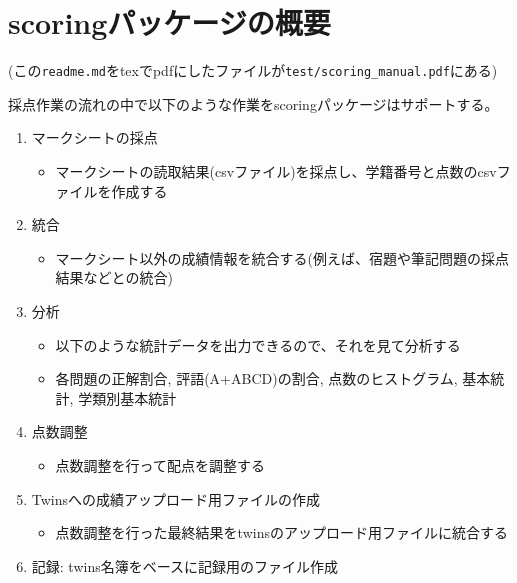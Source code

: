 \def\latexktupreamblefile{scoring_manual.ktu_preamble}
\def\mytitle{scoringパッケージ}
\def\myauthor{山本}
\def\mydate{2019.6.25}
\def\latexxspacing{no}


\newcommand {\mycolor }{olive}

\section{scoringパッケージの概要}
\label{scoringパッケージの概要}

(この\texttt{readme.md}をtexでpdfにしたファイルが\texttt{test\slash scoring\_manual.pdf}にある)

採点作業の流れの中で以下のような作業をscoringパッケージはサポートする。

\begin{enumerate}
\item マークシートの採点

\begin{itemize}
\item マークシートの読取結果(csvファイル)を採点し、学籍番号と点数のcsvファイルを作成する

\end{itemize}

\item 統合

\begin{itemize}
\item マークシート以外の成績情報を統合する(例えば、宿題や筆記問題の採点結果などとの統合)

\end{itemize}

\item 分析

\begin{itemize}
\item 以下のような統計データを出力できるので、それを見て分析する

\item 各問題の正解割合, 評語(A+ABCD)の割合, 点数のヒストグラム, 基本統計, 学類別基本統計

\end{itemize}

\item 点数調整

\begin{itemize}
\item 点数調整を行って配点を調整する

\end{itemize}

\item Twinsへの成績アップロード用ファイルの作成

\begin{itemize}
\item 点数調整を行った最終結果をtwinsのアップロード用ファイルに統合する

\end{itemize}

\item 記録: twins名簿をベースに記録用のファイル作成

\end{enumerate}


